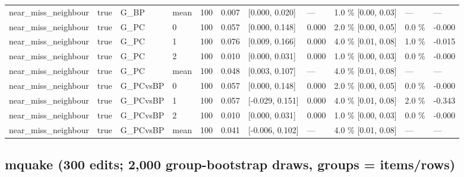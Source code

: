\documentclass[10pt,a4paper]{article}
\begin{document}
\begin{center}
\begin{tabularx}{\textwidth}{@{}p{}XXXXXXXXXX@{}}
near\_miss\_neighbour & true & G\_BP & mean & 100 & 0.007 & [0.000, 0.020] & — & 1.0 \% [0.00, 0.03] & — & — \\
near\_miss\_neighbour & true & G\_PC & 0 & 100 & 0.057 & [0.000, 0.148] & 0.000 & 2.0 \% [0.00, 0.05] & 0.0 \% & -0.000 \\
near\_miss\_neighbour & true & G\_PC & 1 & 100 & 0.076 & [0.009, 0.166] & 0.000 & 4.0 \% [0.01, 0.08] & 1.0 \% & -0.015 \\
near\_miss\_neighbour & true & G\_PC & 2 & 100 & 0.010 & [0.000, 0.031] & 0.000 & 1.0 \% [0.00, 0.03] & 0.0 \% & -0.000 \\
near\_miss\_neighbour & true & G\_PC & mean & 100 & 0.048 & [0.003, 0.107] & — & 4.0 \% [0.01, 0.08] & — & — \\
near\_miss\_neighbour & true & G\_PCvsBP & 0 & 100 & 0.057 & [0.000, 0.148] & 0.000 & 2.0 \% [0.00, 0.05] & 0.0 \% & -0.000 \\
near\_miss\_neighbour & true & G\_PCvsBP & 1 & 100 & 0.057 & [-0.029, 0.151] & 0.000 & 4.0 \% [0.01, 0.08] & 2.0 \% & -0.343 \\
near\_miss\_neighbour & true & G\_PCvsBP & 2 & 100 & 0.010 & [0.000, 0.031] & 0.000 & 1.0 \% [0.00, 0.03] & 0.0 \% & -0.000 \\
near\_miss\_neighbour & true & G\_PCvsBP & mean & 100 & 0.041 & [-0.006, 0.102] & — & 4.0 \% [0.01, 0.08] & — & — \\
\bottomrule
\end{tabularx}
\end{center}



\subsection*{mquake (300 edits; 2,000 group-bootstrap draws, groups = items/rows)}
\end{document}
